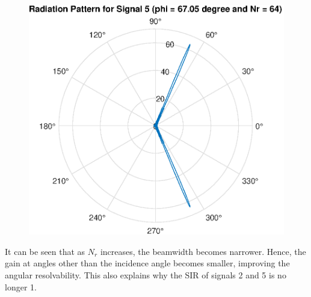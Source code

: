 \begin{figure}[H]
    \centering
    \includegraphics[scale = 0.7]{N64_5.eps}
\end{figure}
It can be seen that as $N_r$ increases, the beamwidth becomes narrower. Hence, the gain at 
angles other than the incidence angle becomes smaller, improving the angular resolvability. 
This also explains why the SIR of signals 2 and 5 is no longer 1.